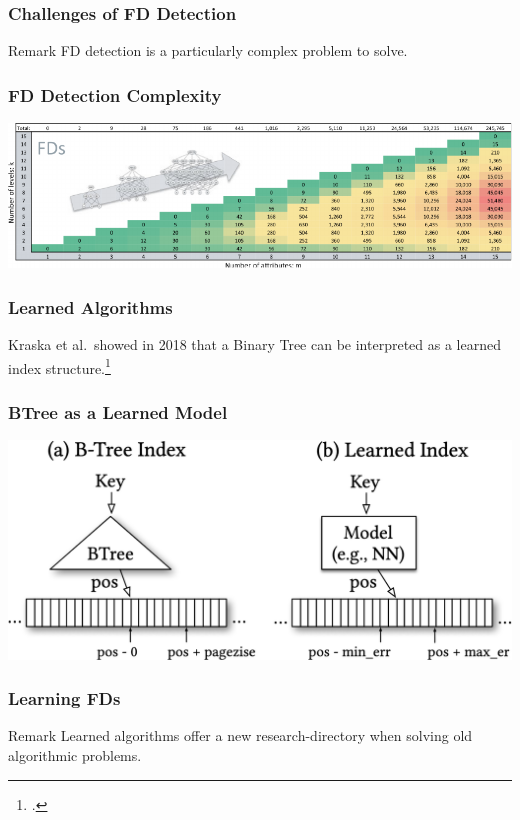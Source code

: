 \documentclass{beamer}
\begin{document}
\begin{frame}
    \frametitle{Challenges of FD Detection}
    \begin{block}{Remark}
        FD detection is a particularly complex problem to solve.
    \end{block}
\end{frame}

\begin{frame}
    \frametitle{FD Detection Complexity}
    \includegraphics[width=\textwidth]{fd_detection_complexity}
\end{frame}

\begin{frame}
    \frametitle{Learned Algorithms}
    Kraska et al.\ showed in 2018 that a Binary Tree can be interpreted
    as a learned index structure.\footcite{KRA18}
\end{frame}

\begin{frame}
    \frametitle{BTree as a Learned Model}
    \includegraphics[width=\textwidth]{btree_as_model}
\end{frame}

\begin{frame}
    \frametitle{Learning FDs}
    \begin{block}{Remark}
        Learned algorithms offer a new research-directory when solving old algorithmic problems.
    \end{block}
\end{frame}
\end{document}
